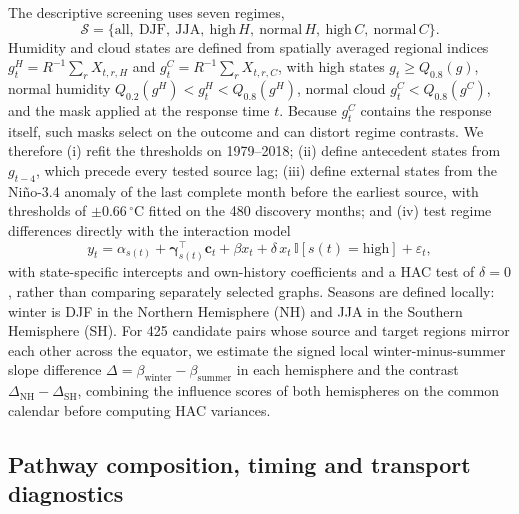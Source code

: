 \documentclass[preprint,12pt]{elsarticle}
\begin{document}
The descriptive screening uses seven regimes,
\begin{equation}
\mathcal{S}=\{\text{all},\ \text{DJF},\ \text{JJA},\ \text{high}\,H,\ \text{normal}\,H,\ \text{high}\,C,\ \text{normal}\,C\}.
\end{equation}
Humidity and cloud states are defined from spatially averaged regional indices $g^{H}_t=R^{-1}\sum_r X_{t,r,H}$ and $g^{C}_t=R^{-1}\sum_r X_{t,r,C}$, with high states $g_t\ge Q_{0.8}(g)$, normal humidity $Q_{0.2}(g^H)<g^H_t<Q_{0.8}(g^H)$, normal cloud $g^C_t<Q_{0.8}(g^C)$, and the mask applied at the response time $t$. Because $g^{C}_t$ contains the response itself, such masks select on the outcome and can distort regime contrasts. We therefore (i) refit the thresholds on 1979--2018; (ii) define antecedent states from $g_{t-4}$, which precede every tested source lag; (iii) define external states from the Ni\~no-3.4 anomaly of the last complete month before the earliest source, with thresholds of $\pm0.66\,^{\circ}$C fitted on the 480 discovery months; and (iv) test regime differences directly with the interaction model
\begin{equation}
y_t=\alpha_{s(t)}+\boldsymbol{\gamma}_{s(t)}^{\top}\mathbf{c}_t+\beta x_t+\delta\,x_t\,\mathbb{I}[s(t)=\mathrm{high}]+\varepsilon_t,
\end{equation}
with state-specific intercepts and own-history coefficients and a HAC test of $\delta=0$, rather than comparing separately selected graphs. Seasons are defined locally: winter is DJF in the Northern Hemisphere (NH) and JJA in the Southern Hemisphere (SH). For 425 candidate pairs whose source and target regions mirror each other across the equator, we estimate the signed local winter-minus-summer slope difference $\Delta=\beta_{\mathrm{winter}}-\beta_{\mathrm{summer}}$ in each hemisphere and the contrast $\Delta_{\mathrm{NH}}-\Delta_{\mathrm{SH}}$, combining the influence scores of both hemispheres on the common calendar before computing HAC variances.

\subsection{Pathway composition, timing and transport diagnostics}
\label{subsec:paths}
\end{document}
